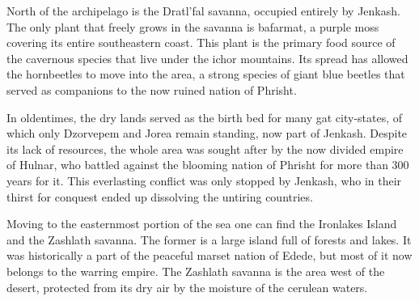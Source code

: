 North of the archipelago is the Dratl'fal savanna, occupied entirely by Jenkash.
The only plant that freely grows in the savanna is bafarmat, a purple moss covering its entire southeastern coast.
This plant is the primary food source of the cavernous species that live under the ichor mountains.
Its spread has allowed the hornbeetles to move into the area, a strong species of giant blue beetles that served as companions to the now ruined nation of Phrisht.

In oldentimes, the dry lands served as the birth bed for many gat city-states, of which only Dzorvepem and Jorea remain standing, now part of Jenkash.
Despite its lack of resources, the whole area was sought after by the now divided empire of Hulnar, who battled against the blooming nation of Phrisht for more than 300 years for it.
This everlasting conflict was only stopped by Jenkash, who in their thirst for conquest ended up dissolving the untiring countries.


Moving to the easternmost portion of the sea one can find the Ironlakes Island and the Zashlath savanna.
The former is a large island full of forests and lakes.
It was historically a part of the peaceful marset nation of Edede, but most of it now belongs to the warring empire.
The Zashlath savanna is the area west of the desert, protected from its dry air by the moisture of the cerulean waters.
